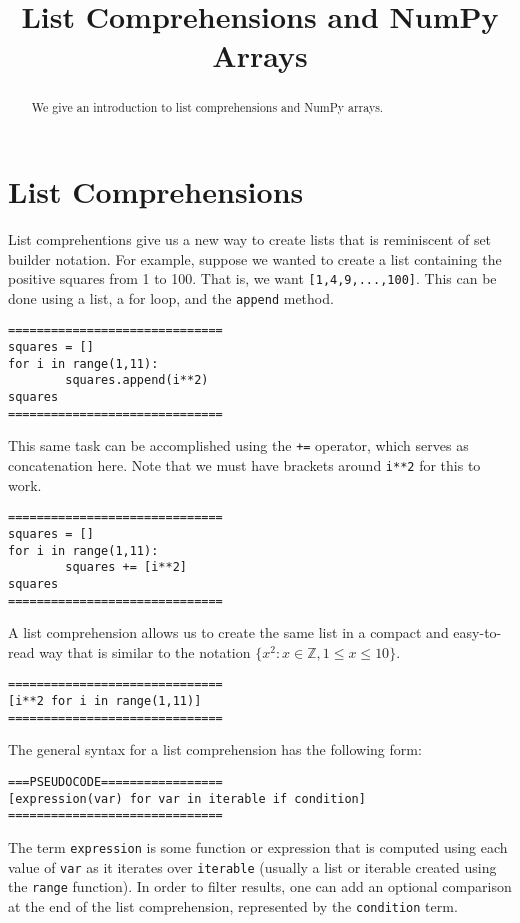\documentclass{ximera}
\title{List Comprehensions and NumPy Arrays}
\begin{document}
  
\begin{abstract}  
We give an introduction to list comprehensions and NumPy arrays.
\end{abstract}  
\maketitle

\section{List Comprehensions}

List comprehentions give us a new way to create lists that is reminiscent of set builder notation. For example, suppose we wanted to create a list containing the positive squares from 1 to 100. That is, we want \verb|[1,4,9,...,100]|. This can be done using a list, a for loop, and the \verb|append| method.

\begin{verbatim}
==============================
squares = []
for i in range(1,11):
        squares.append(i**2)
squares
==============================
\end{verbatim}

This same task can be accomplished using the \verb|+=| operator, which serves as concatenation here. Note that we must have brackets around \verb|i**2| for this to work.

\begin{verbatim}
==============================
squares = []
for i in range(1,11):
        squares += [i**2]
squares
==============================
\end{verbatim}

A list comprehension allows us to create the same list in a compact and easy-to-read way that is similar to the notation $\{x^2:x\in\mathbb{Z},1\leq x\leq 10\}$.

\begin{verbatim}
==============================
[i**2 for i in range(1,11)]
==============================
\end{verbatim}

The general syntax for a list comprehension has the following form:

\begin{verbatim}
===PSEUDOCODE=================
[expression(var) for var in iterable if condition]
==============================
\end{verbatim}

The term \verb|expression| is some function or expression that is computed using each value of \verb|var| as it iterates over \verb|iterable| (usually a list or iterable created using the \verb|range| function). In order to filter results, one can add an optional comparison at the end of the list comprehension, represented by the \verb|condition| term.
\end{document}
